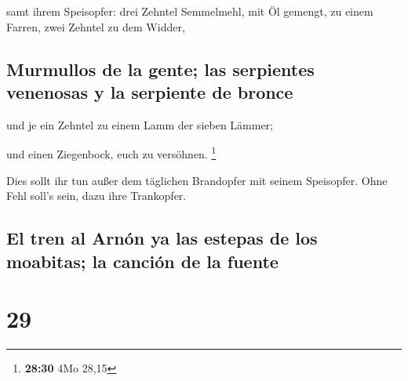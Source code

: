  samt ihrem Speisopfer: drei Zehntel Semmelmehl, mit Öl
gemengt, zu einem Farren, zwei Zehntel zu dem Widder,

\hypertarget{murmullos-de-la-gente-las-serpientes-venenosas-y-la-serpiente-de-bronce}{%
\subsection{Murmullos de la gente; las serpientes venenosas y la
serpiente de
bronce}\label{murmullos-de-la-gente-las-serpientes-venenosas-y-la-serpiente-de-bronce}}

 und je ein Zehntel zu einem Lamm der sieben Lämmer;

 und einen Ziegenbock, euch zu versöhnen. \footnote{\textbf{28:30}
  4Mo 28,15}

 Dies sollt ihr tun außer dem täglichen Brandopfer mit
seinem Speisopfer. Ohne Fehl soll's sein, dazu ihre Trankopfer.

\hypertarget{el-tren-al-arnuxf3n-ya-las-estepas-de-los-moabitas-la-canciuxf3n-de-la-fuente}{%
\subsection{El tren al Arnón ya las estepas de los moabitas; la canción
de la
fuente}\label{el-tren-al-arnuxf3n-ya-las-estepas-de-los-moabitas-la-canciuxf3n-de-la-fuente}}

\hypertarget{section-28}{%
\section{29}\label{section-28}}

